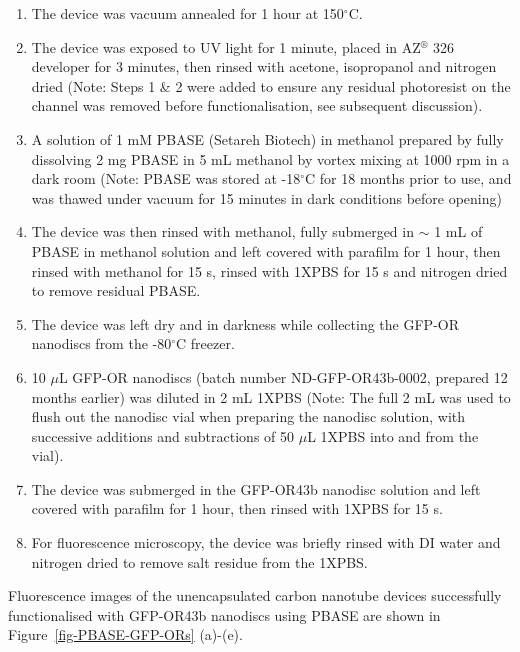 \documentclass[
  a4paper,
]{scrbook}
\begin{document}
\begin{enumerate}
\def\labelenumi{\arabic{enumi}.}
\item
  The device was vacuum annealed for 1 hour at 150\(^\circ\)C.
\item
  The device was exposed to UV light for 1 minute, placed in
  AZ\(^\circledR\) 326 developer for 3 minutes, then rinsed with
  acetone, isopropanol and nitrogen dried (Note: Steps 1 \& 2 were added
  to ensure any residual photoresist on the channel was removed before
  functionalisation, see subsequent discussion).
\item
  A solution of 1 mM PBASE (Setareh Biotech) in methanol prepared by
  fully dissolving 2 mg PBASE in 5 mL methanol by vortex mixing at 1000
  rpm in a dark room (Note: PBASE was stored at -18\(^\circ\)C for 18
  months prior to use, and was thawed under vacuum for 15 minutes in
  dark conditions before opening)
\item
  The device was then rinsed with methanol, fully submerged in \(\sim\)
  1 mL of PBASE in methanol solution and left covered with parafilm for
  1 hour, then rinsed with methanol for 15 s, rinsed with 1XPBS for 15 s
  and nitrogen dried to remove residual PBASE.
\item
  The device was left dry and in darkness while collecting the GFP-OR
  nanodiscs from the -80\(^\circ\)C freezer.
\item
  10 \(\mu\)L GFP-OR nanodiscs (batch number ND-GFP-OR43b-0002, prepared
  12 months earlier) was diluted in 2 mL 1XPBS (Note: The full 2 mL was
  used to flush out the nanodisc vial when preparing the nanodisc
  solution, with successive additions and subtractions of 50 \(\mu\)L
  1XPBS into and from the vial).
\item
  The device was submerged in the GFP-OR43b nanodisc solution and left
  covered with parafilm for 1 hour, then rinsed with 1XPBS for 15 s.
\item
  For fluorescence microscopy, the device was briefly rinsed with DI
  water and nitrogen dried to remove salt residue from the 1XPBS.
\end{enumerate}

Fluorescence images of the unencapsulated carbon nanotube devices
successfully functionalised with GFP-OR43b nanodiscs using PBASE are
shown in Figure~\ref{fig-PBASE-GFP-ORs} (a)-(e).
\end{document}

